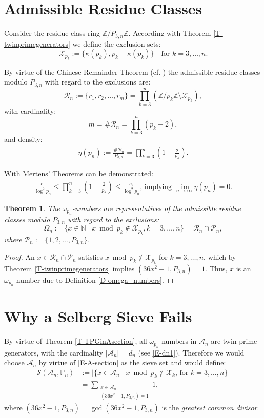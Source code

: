 \documentclass[fmeq,reqno]{amsart}
\newtheorem{theorem}{Theorem}[section]
\theoremstyle{definition}
\theoremstyle{remark}
\numberwithin{equation}{section}
\newcommand{\p}{\mathbb{P}}
\newcommand{\mc}[1]{\mathcal{#1}}
\newcommand{\sieb}{\mathcal{S}}
\newcommand{\opn}[1]{\operatorname{#1}}
\newcommand{\abs}[1]{\lvert#1\rvert}
\newcommand{\om}[1]{$\omega_{#1}$}
\newcommand{\set}[1]{\lbrace #1\rbrace}
\begin{document}
\section{Admissible Residue Classes}

Consider the residue class ring $\mathbb{Z} / P_{3,n} \mathbb{Z}$. According with Theorem \ref{T-twinprimegenerators} we define the exclusion sets:
\[
\mc{X}_{p_k} := \{ \kappa(p_k), p_k-\kappa(p_k) \} \quad \text{for } k = 3, \ldots, n.
\]

By virtue of the Chinese Remainder Theorem (cf. \cite[Chapter 2, \S~ 2.2]{bundschuh})
the admissible residue classes modulo $P_{3,n}$ with regard to the exclusions are:
\[
\mc{R}_n := \{ r_1, r_2, \ldots, r_m \} = \prod_{k=3}^n \left( \mathbb{Z} / p_k \mathbb{Z} \setminus \mc{X}_{p_k} \right),
\]
with cardinality:
\[
m = \#\mc{R}_n = \prod_{k=3}^n (p_k - 2),
\]
and density:
\begin{align}\label{E-eta}
\eta(p_n) := \frac{\#\mc{R}_n}{P_{3,n}} = \prod_{k=3}^n \left(1 - \frac{2}{p_k}\right).
\end{align}

With Mertens' Theorems can be demonstrated:
\begin{align}\label{E-limEta}
\frac{c_1}{\log^2 p_n}\leq \prod_{k=3}^n \left(1-\frac{2}{p_k}\right)\leq\frac{c_2}{\log^2 p_n}
\text{, implying }\lim_{n\rightarrow\infty} \eta(p_n) = 0.
\end{align}

\begin{theorem}\label{T-omegaARC}
The $\omega_{p_n}$-numbers are representatives of the admissible residue classes modulo $P_{3,n}$ with regard to the exclusions:
\[
\Omega_n := \{ x \in \mathbb{N} \mid x \bmod p_k \notin \mc{X}_{p_k}, k = 3, \ldots, n \} = \mc{R}_n \cap \mc{P}_n,
\]
where $\mc{P}_n := \{ 1, 2, \ldots, P_{3,n} \}$.
\end{theorem}
\begin{proof}
An $x \in \mc{R}_n \cap \mc{P}_n$ satisfies $x \bmod p_k \notin \mc{X}_{p_k}$ for $k = 3, \ldots, n$, which by Theorem \ref{T-twinprimegenerators} implies $(36x^2 - 1, P_{3,n}) = 1$. Thus, $x$ is an $\omega_{p_n}$-number due to Definition \ref{D-omega_numbers}.
\end{proof}
\medskip

\section{Why a Selberg Sieve Fails}\label{S-Sieve}
By virtue of Theorem \ref{T-TPGinAsection}, all \om{p_n}-numbers in $\mc{A}_n$ are twin prime generators, with the cardinality $\abs{\mc{A}_n} = d_n$ (see \eqref{E-dn1}). Therefore we would choose $\mc{A}_n$ by virtue of \eqref{E-A-section} as the sieve set and would define:
\begin{align}
\sieb(\mc{A}_n, \p_n) &:= \abs{\set{x\in\mc{A}_n\mid x \bmod p_k \notin \mc{X}_k \text{, for } k=3,\ldots,n }}\nonumber\\
&= \sum_{\substack{x \in \mc{A}_n \\ (36x^2 - 1, P_{3,n}) = 1}} 1,\label{E-SieveFunction}
\end{align}
where $(36x^2 - 1, P_{3,n})=\opn{gcd}(36x^2 - 1, P_{3,n})$ is the \emph{greatest common divisor}.
\end{document}
